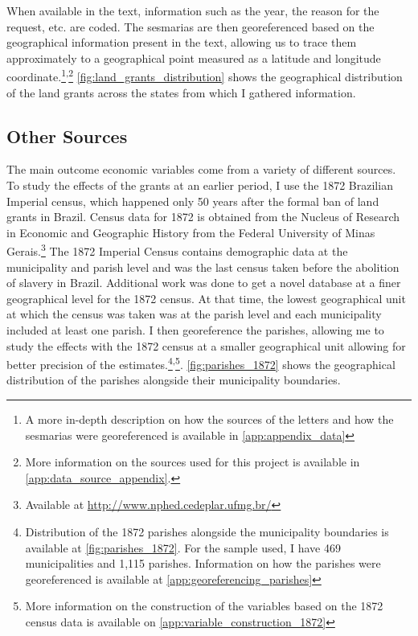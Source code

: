 \documentclass{article}
\begin{document}
When available in the text, information such as the year, the reason for the request, etc. are coded. 
The sesmarias are then georeferenced based on the geographical information present in the text, allowing us to trace them approximately to a geographical point measured as a latitude and longitude coordinate.\footnote{A more in-depth description on how the sources of the letters and how the sesmarias were georeferenced is available in \autoref{app:appendix_data}}\textsuperscript{,}\footnote{More information on the sources used for this project is available in \autoref{app:data_source_appendix}.} \autoref{fig:land_grants_distribution} shows the geographical distribution of the land grants across the states from which I gathered information. 

\subsection{Other Sources}

The main outcome economic variables come from a variety of different sources.
To study the effects of the grants at an earlier period, I use the 1872 Brazilian Imperial census, which happened only 50 years after the formal ban of land grants in Brazil.
Census data for 1872 is obtained from the Nucleus of Research in Economic and Geographic History from the Federal University of Minas Gerais.\footnote{
  Available at \url{http://www.nphed.cedeplar.ufmg.br/}}
The 1872 Imperial Census contains demographic data at the municipality and parish level and was the last census taken before the abolition of slavery in Brazil. 
Additional work was done to get a novel database at a finer geographical level for the 1872 census.
At that time, the lowest geographical unit at which the census was taken was at the parish level and each municipality included at least one parish.
I then georeference the parishes, allowing me to study the effects with the 1872 census at a smaller geographical unit allowing for better precision of the estimates.\footnote{Distribution of the 1872 parishes alongside the municipality boundaries is available at \autoref{fig:parishes_1872}. For the sample used, I have 469 municipalities and 1,115 parishes. Information on how the parishes were georeferenced is available at \autoref{app:georeferencing_parishes}}\textsuperscript{,}\footnote{More information on the construction of the variables based on the 1872 census data is available on \autoref{app:variable_construction_1872}}. \autoref{fig:parishes_1872} shows the geographical distribution of the parishes alongside their municipality boundaries. 
\end{document}
